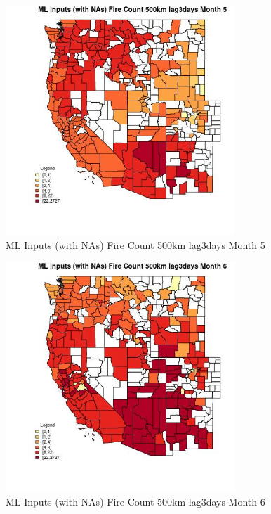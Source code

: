 \begin{figure} 
\centering  
\includegraphics[width=0.77\textwidth]{Code_Outputs/Report_ML_input_PM25_Step4_part_f_de_duplicated_aves_prioritize_24hr_obswNAs_CountyFire_Count_500km_lag3daysmedianMonth5.jpg} 
\caption{\label{fig:Report_ML_input_PM25_Step4_part_f_de_duplicated_aves_prioritize_24hr_obswNAsCountyFire_Count_500km_lag3daysmedianMonth5}ML Inputs (with NAs) Fire Count 500km lag3days Month 5} 
\end{figure} 
 

\begin{figure} 
\centering  
\includegraphics[width=0.77\textwidth]{Code_Outputs/Report_ML_input_PM25_Step4_part_f_de_duplicated_aves_prioritize_24hr_obswNAs_CountyFire_Count_500km_lag3daysmedianMonth6.jpg} 
\caption{\label{fig:Report_ML_input_PM25_Step4_part_f_de_duplicated_aves_prioritize_24hr_obswNAsCountyFire_Count_500km_lag3daysmedianMonth6}ML Inputs (with NAs) Fire Count 500km lag3days Month 6} 
\end{figure} 
 

